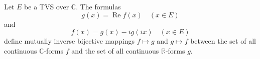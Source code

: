Let $E$ be a TVS over $\mathbb{C}$. The formulas
$$g(x) = \operatorname{Re} f(x) \quad (x \in E)$$
and
$$f(x) = g(x) - ig(ix) \quad (x \in E)$$
define mutually inverse bijective mappings $f \mapsto g$ and $g \mapsto f$ between the set of all continuous $\mathbb{C}$-forms $f$ and the set of all continuous $\mathbb{R}$-forms $g$.
